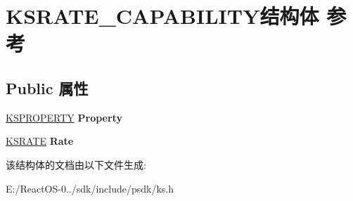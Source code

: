 \hypertarget{struct_k_s_r_a_t_e___c_a_p_a_b_i_l_i_t_y}{}\section{K\+S\+R\+A\+T\+E\+\_\+\+C\+A\+P\+A\+B\+I\+L\+I\+T\+Y结构体 参考}
\label{struct_k_s_r_a_t_e___c_a_p_a_b_i_l_i_t_y}
\subsection*{Public 属性}
\begin{DoxyCompactItemize}
\item 
\mbox{\label{struct_k_s_r_a_t_e___c_a_p_a_b_i_l_i_t_y_a109cd73aa2873d34e522f6537a4e7daa}} 
\hyperlink{struct_k_s_i_d_e_n_t_i_f_i_e_r}{K\+S\+P\+R\+O\+P\+E\+R\+TY} {\bfseries Property}
\item 
\mbox{\label{struct_k_s_r_a_t_e___c_a_p_a_b_i_l_i_t_y_a12e47c0b7751655cd43433b0d595521a}} 
\hyperlink{struct_k_s_r_a_t_e}{K\+S\+R\+A\+TE} {\bfseries Rate}
\end{DoxyCompactItemize}


该结构体的文档由以下文件生成\+:\begin{DoxyCompactItemize}
\item 
E\+:/\+React\+O\+S-\/0../sdk/include/psdk/ks.\+h\end{DoxyCompactItemize}
